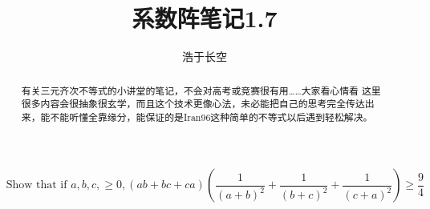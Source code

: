 \documentclass[UTF8]{ctexart}
\begin{document}
\title{系数阵笔记1.7}
\author{浩于长空}
\maketitle
$$\text { Show that if } a, b, c,\geq 0,(a b+b c+c a)\left(\dfrac{1}{(a+b)^{2}}+\dfrac{1}{(b+c)^{2}}+\dfrac{1}{(c+a)^{2}}\right) \geq \dfrac{9}{4}
$$
\begin{flushright}
\end{flushright}
\begin{displaymath}
\end{displaymath}
\begin{abstract}
	有关三元齐次不等式的小讲堂的笔记，不会对高考或竞赛很有用……大家看心情看
	这里很多内容会很抽象很玄学，而且这个技术更像心法，未必能把自己的思考完全传达出来，能不能听懂全靠缘分，能保证的是Iran96这种简单的不等式以后遇到轻松解决。
\end{abstract}

\newpage
\end{document}
